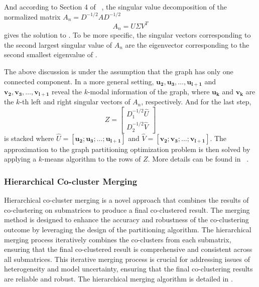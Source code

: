 \documentclass[journal]{IEEEtran}
\renewcommand{\cite}[1]{~\autocite{#1}}
\begin{document}
And according to Section 4 of \cite{dhillon2001CoclusteringDocumentsWords}, the singular value decomposition of the normalized matrix $A_n = D^{-1/2} A D^{-1/2}$
\begin{equation}
  A_n = U \Sigma V^T
\end{equation}
gives the solution to . To be more specific, the singular vectors corresponding to the second largest singular value of $A_n$ are the eigenvector corresponding to the second smallest eigenvalue of .

The above discussion is under the assumption that the graph has only one connected component. In a more general setting, $\mathbf{u_2}, \mathbf{u_3}, \ldots, \mathbf{u_{l+1}}$ and $\mathbf{v_2}, \mathbf{v_3}, \ldots, \mathbf{v_{l+1}}$ reveal the $k$-modal information of the graph, where $\mathbf{u_k}$ and $\mathbf{v_k}$ are the $k$-th left and right singular vectors of $A_n$, respectively. And for the last step,
\begin{equation} Z = \begin{bmatrix} D_1^{-1/2} \hat{U} \\ D_2^{-1/2} \hat{V} \end{bmatrix} \end{equation}
is stacked where $\hat{U} = [\mathbf{u_2}; \mathbf{u_3}; \ldots; \mathbf{u_{l+1}}]$ and $\hat{V} = [\mathbf{v_2}; \mathbf{v_3}; \ldots; \mathbf{v_{l+1}}]$. The approximation to the graph partitioning optimization problem is then solved by applying a $k$-means algorithm to the rows of $Z$. More details can be found in \cite{dhillon2001CoclusteringDocumentsWords}.

\subsubsection{Hierarchical Co-cluster Merging}

Hierarchical co-cluster merging is a novel approach that combines the results of co-clustering on submatrices to produce a final co-clustered result. The merging method is designed to enhance the accuracy and robustness of the co-clustering outcome by leveraging the design of the partitioning algorithm. The hierarchical merging process iteratively combines the co-clusters from each submatrix, ensuring that the final co-clustered result is comprehensive and consistent across all submatrices. This iterative merging process is crucial for addressing issues of heterogeneity and model uncertainty, ensuring that the final co-clustering results are reliable and robust. The hierarchical merging algorithm is detailed in .
\end{document}

